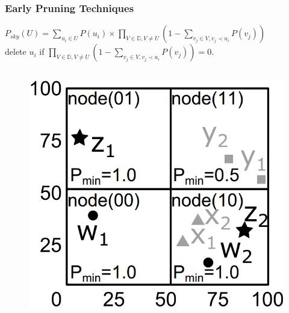 \documentclass{beamer}
\begin{document}
\begin{frame}
\frametitle{Early Pruning Techniques}

\begin{lemma}
$P_{sky}(U)=\sum\limits_{u_i\in U} P(u_i)\times\prod\limits_{V\in\mathbb{D},V\neq U}(1-\sum\limits_{v_j\in V,v_j\prec u_i}P(v_j))$\\
delete $u_i$ if $\prod\limits_{V\in\mathbb{D},V\neq U}(1-\sum\limits_{v_j\in V,v_j\prec u_i}P(v_j)) = 0$.
\end{lemma}

\begin{columns}[c] %
\begin{figure}[htpb]
  \begin{center}
	\includegraphics[width=\linewidth]{node.png}
  \end{center}
\end{figure}


\end{columns}
\end{frame}
\end{document}
